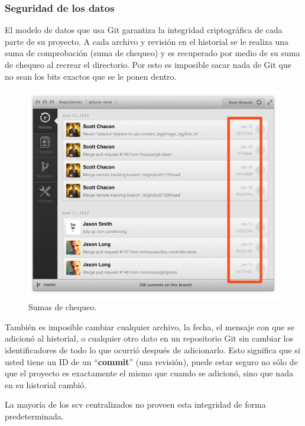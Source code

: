 \documentclass[12pt, spanish, oneside, onecolumn, a4paper]{report}
\begin{document}


\clearpage

\subsubsection{Seguridad de los datos}
\label{sec:dataassurance}


El modelo de datos que usa Git garantiza la integridad criptográfica de cada parte de su proyecto. A cada archivo y revisión en el historial se le realiza una suma de comprobación (suma de chequeo) y es recuperado por medio de su suma de chequeo al recrear el directorio. Por esto es imposible sacar nada de Git que no sean los bits exactos que se le ponen dentro.


\begin{figure}
  \begin{center}
  \includegraphics[width=.6\textwidth,keepaspectratio=true]{assurance.png}
  \end{center}
  \caption{Sumas de chequeo.}
\end{figure}


También es imposible cambiar cualquier archivo, la fecha, el mensaje con que se adicionó al historial, o cualquier otro dato en un repositorio Git sin cambiar los identificadores de todo lo que ocurrió después de adicionarlo. Esto significa que si usted tiene un ID de un ``\textbf{commit}'' (una revisión), puede estar seguro no sólo de que el proyecto es exactamente el mismo que cuando se adicionó, sino que nada en su historial cambió.

La mayoría de los \gls{scv} centralizados no proveen esta integridad de forma predeterminada.
\end{document}
